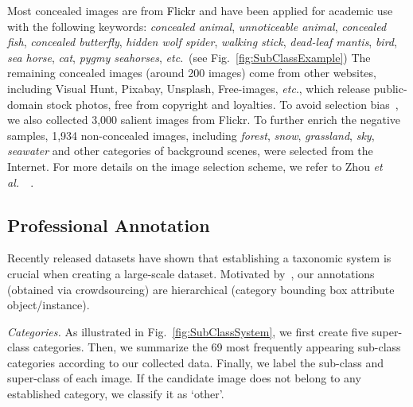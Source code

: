 \documentclass[10pt,journal,compsoc]{IEEEtran}
\def\etc{\emph{etc}}
\def\etal{{\em et al.~}}
\newcommand{\figref}[1]{Fig.~\ref{#1}}
\newcommand{\Rev}[1]{\textcolor{black}{#1}}
\begin{document}
Most concealed images are from \Rev{Flickr} and have been applied for academic
use with the following keywords:
\emph{concealed animal}, \emph{unnoticeable animal}, \emph{concealed fish},
\emph{concealed butterfly}, \emph{hidden wolf spider}, \emph{walking stick},
\emph{dead-leaf mantis}, \emph{bird}, \emph{sea horse}, \emph{cat},
\emph{pygmy seahorses}, \etc.~(see \figref{fig:SubClassExample})
The remaining concealed images (around 200 images) come from other websites,
including Visual Hunt, Pixabay, Unsplash, Free-images, \etc.,
which release public-domain stock photos, free from copyright and loyalties.
To avoid selection bias~\cite{Fan2021SOC}, 
we also collected 3,000 salient images from Flickr. 
To further enrich the negative samples, 1,934 non-concealed
images, including \emph{forest}, \emph{snow}, \emph{grassland}, \emph{sky}, \emph{seawater}
and other categories of background scenes, were selected from the Internet.
For more details on the image selection scheme, we refer to Zhou \etal~\cite{zhou2017places}.


\subsection{Professional Annotation}

Recently released datasets
\cite{wang2018revisiting,Fan2019D3Net,damen2018scaling} 
have shown that establishing a taxonomic system is crucial when creating 
a large-scale dataset.
Motivated by~\cite{mo2019partnet}, our annotations (obtained via crowdsourcing) 
are hierarchical (category  bounding box 
attribute   object/instance). 






 \emph{Categories.}
As illustrated in \figref{fig:SubClassSystem}, 
we first create five super-class categories.
Then, we summarize the 69 most frequently appearing sub-class categories 
according to our collected data.
Finally, we label the sub-class and super-class of each image.
If the candidate image does not belong to any established category,
we classify it as `other'.
\end{document}
